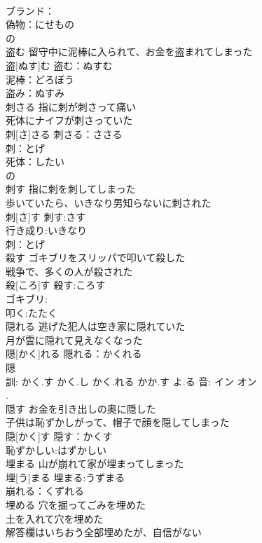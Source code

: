 \documentclass[8pt]{extreport}
\begin{document}
\begin{CJK}{UTF8}{min}
\\	ブランド：
\\	偽物：にせもの
\\	の
\\	盗む	留守中に泥棒に入られて、お金を盗まれてしまった 
\\	盗[ぬす]む			盗む：ぬすむ
\\	泥棒：どろぼう
\\	盗み：ぬすみ
\\	刺さる	指に刺が刺さって痛い 
\\	死体にナイフが刺さっていた 
\\	刺[さ]さる			刺さる：ささる
\\	刺：とげ
\\	死体：したい
\\	の 
\\	刺す	指に刺を刺してしまった 
\\	歩いていたら、いきなり男知らないに刺された 
\\	刺[さ]す			刺す:さす
\\	行き成り:いきなり
\\	刺：とげ
\\	殺す	ゴキブリをスリッパで叩いて殺した 
\\	戦争で、多くの人が殺された 
\\	殺[ころ]す			殺す:ころす
\\	ゴキブリ:
\\	叩く:たたく
\\	隠れる	逃げた犯人は空き家に隠れていた 
\\	月が雲に隠れて見えなくなった 
\\	隠[かく]れる			隠れる：かくれる
\\	隠 
\\	訓: かく.す かく.し かく.れる かか.す よ.る 音: イン オン 
\\	[隱].	
\\	隠す	お金を引き出しの奥に隠した 
\\	子供は恥ずかしがって、帽子で顔を隠してしまった 
\\	隠[かく]す			隠す：かくす
\\	恥ずかしい:はずかしい
\\	埋まる	山が崩れて家が埋まってしまった 
\\	埋[う]まる			埋まる:うずまる
\\	崩れる：くずれる
\\	埋める	穴を掘ってごみを埋めた 
\\	土を入れて穴を埋めた 
\\	解答欄はいちおう全部埋めたが、自信がない 

\end{CJK}
\end{document}
